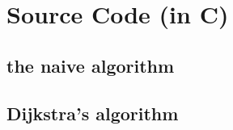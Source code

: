 \chapter{Source Code (in C)}

\section{the naive algorithm}







\section{Dijkstra's algorithm}







